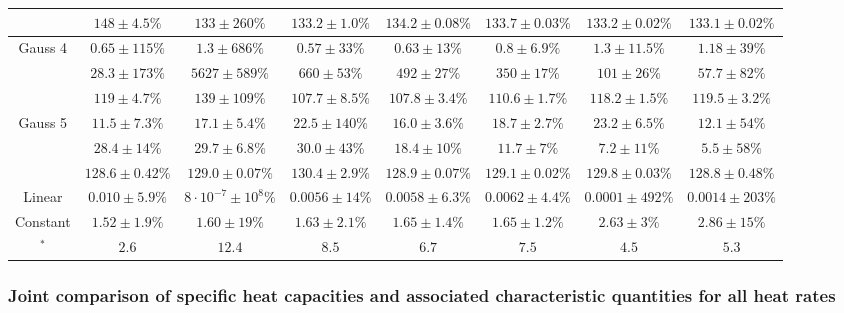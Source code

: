 \documentclass{scrartcl}[12pt, halfparskip]
\numberwithin{equation}{section}
\numberwithin{figure}{section}
\numberwithin{table}{section}
\begin{document}
\begin{landscape}
\begin{table}[H]
\begin{tabular}{| c | c | c | c | c | c | c | c |}
		& $148 \pm 4.5\%$ & $133 \pm 260\%$ & $133.2 \pm 1.0\%$ & $134.2 \pm 0.08\%$ & $133.7 \pm 0.03\%$ & $133.2 \pm 0.02\%$ & $133.1 \pm 0.02\%$ \\ \hline
		Gauss 4 & $0.65 \pm 115\%$ & $1.3 \pm 686\%$ & $0.57 \pm 33\%$ & $0.63 \pm 13\%$ & $0.8 \pm 6.9\%$ & $1.3 \pm 11.5\%$ & $1.18 \pm 39\%$ \\
		& $28.3 \pm 173\%$ & $5627 \pm 589\%$ & $660 \pm 53\%$ & $492 \pm 27\%$ & $350 \pm 17\%$ & $101 \pm 26\%$ & $57.7 \pm 82\%$ \\
		& $119 \pm 4.7\%$ & $139 \pm 109\%$ & $107.7 \pm 8.5\%$ & $107.8 \pm 3.4\%$ & $110.6 \pm 1.7\%$ & $118.2 \pm 1.5\%$ & $119.5 \pm 3.2\%$ \\ \hline
		Gauss 5 & $11.5 \pm 7.3\%$ & $17.1 \pm 5.4\%$ & $22.5 \pm 140\%$ & $16.0 \pm 3.6\%$ & $18.7 \pm 2.7\%$ & $23.2 \pm 6.5\%$ & $12.1 \pm 54\%$ \\
		& $28.4 \pm 14\%$ & $29.7 \pm 6.8\%$ & $30.0 \pm 43\%$ & $18.4 \pm 10\%$ & $11.7 \pm 7\%$ & $7.2 \pm 11\%$ & $5.5 \pm 58\%$ \\
		& $128.6 \pm 0.42\%$ & $129.0 \pm 0.07\%$ & $130.4 \pm 2.9\%$ & $128.9 \pm 0.07\%$ & $129.1 \pm 0.02\%$ & $129.8 \pm 0.03\%$ & $128.8 \pm 0.48\%$ \\ \hline
		Linear & $0.010 \pm 5.9\%$ & $8 \cdot 10^{-7} \pm 10^8\%$ & $0.0056 \pm 14\%$ & $0.0058 \pm 6.3\%$ & $0.0062 \pm 4.4\%$ & $0.0001 \pm 492\%$ & $0.0014 \pm 203\%$ \\
		Constant & $1.52 \pm 1.9\%$ & $1.60 \pm 19\%$ & $1.63 \pm 2.1\%$ & $1.65 \pm 1.4\%$ & $1.65 \pm 1.2\%$ & $2.63 \pm 3\%$ & $2.86 \pm 15\%$ \\ \hline \hline
		[NOC1]$^*$ & $2.6$ & $12.4$ & $8.5$ & $6.7$ & $7.5$ & $4.5$ & $5.3$ \\ \hline
	\end{tabular}
	\label{tab:parameter_table_5Gaussians}
\end{table}

\end{landscape}
\newpage

\subsubsection{Joint comparison of specific heat capacities and associated characteristic quantities for all heat rates}
\label{sec:param_estimation_Gaussians_joint}
\end{document}
